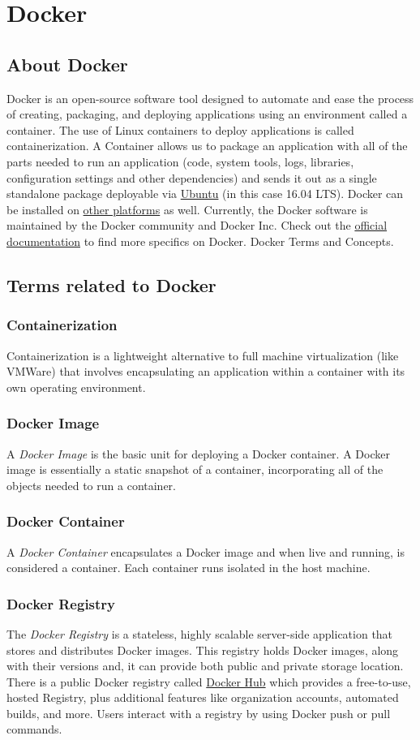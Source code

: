 \documentclass[12pt]{article}
\begin{document}
	
\section{Docker}
\subsection{About Docker}
Docker is an open-source software tool designed to automate and ease the process of creating, packaging, and deploying applications using an environment called a container. The use of Linux containers to deploy applications is called containerization. A Container allows us to package an application with all of the parts needed to run an application (code, system tools, logs, libraries, configuration settings and other dependencies) and sends it out as a single standalone package deployable via \href{https://goo.gl/f77a2v}{Ubuntu} (in this case 16.04 LTS). Docker can be installed on \href{https://goo.gl/iTES81}{other platforms} as well. Currently, the Docker software is maintained by the Docker community and Docker Inc. Check out the \href{https://docs.docker.com/}{official documentation} to find more specifics on Docker. Docker Terms and Concepts. 
\subsection{Terms related to Docker}
\subsubsection{Containerization}
Containerization is a lightweight alternative to full machine virtualization (like VMWare) that involves encapsulating an application within a container with its own operating environment.
\subsubsection{Docker Image}
A \textit{Docker Image} is the basic unit for deploying a Docker container. A Docker image is essentially a static snapshot of a container, incorporating all of the objects needed to run a container.
\subsubsection{Docker Container}
A \textit{Docker Container} encapsulates a Docker image and when live and running, is considered a container. Each container runs isolated in the host machine.
\subsubsection{Docker Registry}
The \textit{Docker Registry} is a stateless, highly scalable server-side application that stores and distributes Docker images. This registry holds Docker images, along with their versions and, it can provide both public and private storage location. There is a public Docker registry called \href{https://hub.docker.com/}{Docker Hub} which provides a free-to-use, hosted Registry, plus additional features like organization accounts, automated builds, and more. Users interact with a registry by using Docker push or pull commands.
\end{document}
